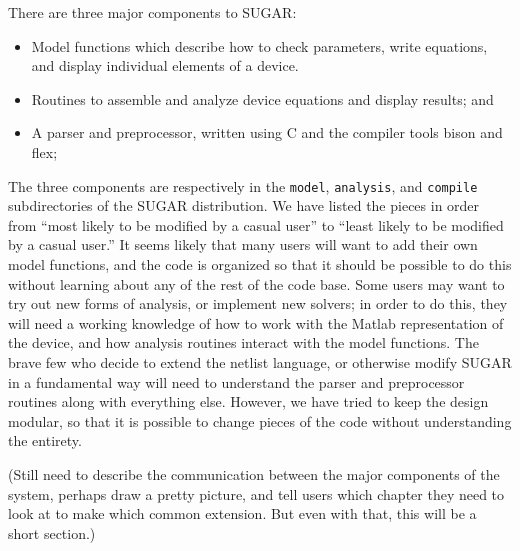 

There are three major components to SUGAR:
\begin{itemize}
 \item Model functions which describe how to check parameters, write
       equations, and display individual elements of a device.
 \item Routines to assemble and analyze device equations and display
       results; and
 \item A parser and preprocessor, written using C and the compiler tools
       bison and flex;
\end{itemize}

The three components are respectively in the \texttt{model},
\texttt{analysis}, and \texttt{compile} subdirectories of the SUGAR 
distribution.  We have listed the pieces in order from ``most likely to
be modified by a casual user'' to ``least likely to be modified by
a casual user.''  It seems likely that many users will want to add
their own model functions, and the code is organized so that it should
be possible to do this without learning about any of the rest of
the code base.  Some users may want to try out new forms of analysis,
or implement new solvers; in order to do this, they will need a working
knowledge of how to work with the Matlab representation of the device,
and how analysis routines interact with the model functions.  The
brave few who decide to extend the netlist language, or otherwise modify
SUGAR in a fundamental way will need to understand the parser and
preprocessor routines along with everything else.  However, we have tried
to keep the design modular, so that it is possible to change pieces of
the code without understanding the entirety.

(Still need to describe the communication between the major components
of the system, perhaps draw a pretty picture, and tell users which chapter
they need to look at to make which common extension.  But even with that,
this will be a short section.)
